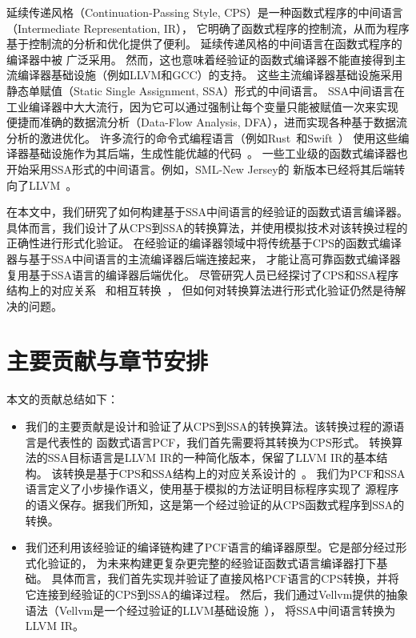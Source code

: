 延续传递风格（Continuation-Passing Style, CPS）是一种函数式程序的中间语言（Intermediate Representation, IR），
它明确了函数式程序的控制流，从而为程序基于控制流的分析和优化提供了便利。
延续传递风格的中间语言在函数式程序的编译器中被
广泛采用\cite{belanger-cpp2013,dargaye2009verification,zoe-oopsla2021,zoe-icfp2021,wang-esop2016}。
然而，这也意味着经验证的函数式编译器不能直接得到主流编译器基础设施（例如LLVM和GCC）的支持。
这些主流编译器基础设施采用静态单赋值（Static Single Assignment, SSA）形式的中间语言。 
SSA中间语言在工业编译器中大大流行，因为它可以通过强制让每个变量只能被赋值一次来实现
便捷而准确的数据流分析（Data-Flow Analysis, DFA），进而实现各种基于数据流分析的激进优化。
许多流行的命令式编程语言（例如Rust~\cite{balasubramanian2017system}和Swift~\cite{zhang2012swift}）
使用这些编译器基础设施作为其后端，生成性能优越的代码~\cite{lattner2006introduction}。
一些工业级的函数式编译器也开始采用SSA形式的中间语言。例如，SML-New Jersey的
新版本已经将其后端转向了LLVM~\cite{farvardin2020new}。

在本文中，我们研究了如何构建基于SSA中间语言的经验证的函数式语言编译器。
具体而言，我们设计了从CPS到SSA的转换算法，并使用模拟技术对该转换过程的正确性进行形式化验证。
在经验证的编译器领域中将传统基于CPS的函数式编译器与基于SSA中间语言的主流编译器后端连接起来，
才能让高可靠函数式编译器复用基于SSA语言的编译器后端优化。
尽管研究人员已经探讨了CPS和SSA程序结构上的对应关系~\cite{appel1998ssa,ssabook}
和相互转换~\cite{farvardin2020new,kelsey1995correspondence}，
但如何对转换算法进行形式化验证仍然是待解决的问题。

\section{主要贡献与章节安排}

本文的贡献总结如下：

\begin{itemize}
    \item
    我们的主要贡献是设计和验证了从CPS到SSA的转换算法。该转换过程的源语言是代表性的
    函数式语言PCF\cite{plotkin1977lcf}，我们首先需要将其转换为CPS形式。
    转换算法的SSA目标语言是LLVM IR的一种简化版本，保留了LLVM IR的基本结构。
    该转换是基于CPS和SSA结构上的对应关系设计的~\cite{appel1998ssa,kelsey1995correspondence}。
    我们为PCF和SSA语言定义了小步操作语义，使用基于模拟的方法证明目标程序实现了
    源程序的语义保存。据我们所知，这是第一个经过验证的从CPS函数式程序到SSA的转换。
    
    \item 
    我们还利用该经验证的编译链构建了PCF语言的编译器原型。它是部分经过形式化验证的，
    为未来构建更复杂更完整的经验证函数式语言编译器打下基础。
    具体而言，我们首先实现并验证了直接风格PCF语言的CPS转换，并将它连接到经验证的CPS到SSA的编译过程。
    然后，我们通过Vellvm提供的抽象语法（Vellvm是一个经过验证的LLVM基础设施~\cite{zakowski2021modular}），
    将SSA中间语言转换为LLVM IR。
    
\end{itemize}

